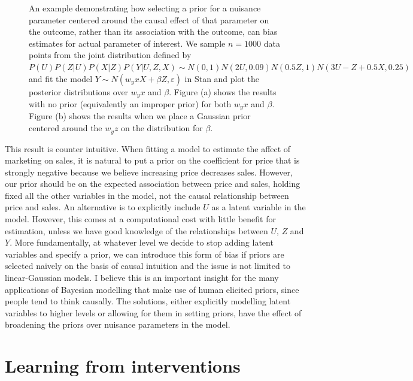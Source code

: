 \documentclass[11pt,a4paper,oneside]{book}
\theoremstyle{plain}
\theoremstyle{definition}
\let\epsilon\varepsilon
\begin{document}
\begin{figure}[h]
\begin{subfigure}[t]{0.99\textwidth}
\end{subfigure}
\caption{An example demonstrating how selecting a prior for a nuisance parameter centered around the causal effect of that parameter on the outcome, rather than its association with the outcome, can bias estimates for actual parameter of interest. We sample $n=1000$ data points from the joint distribution defined by $P(U)P(Z|U)P(X|Z)P(Y|U,Z,X) \sim N(0,1)N(2U,0.09)N(0.5Z,1)N(3U -Z + 0.5X , 0.25)$ and fit the model $Y \sim N(w_yx X+\beta Z,\epsilon)$ in Stan and plot the posterior distributions over $w_yx$ and $\beta$. Figure (a) shows the results with no prior (equivalently an improper prior) for both $w_yx$ and $\beta$. Figure (b) shows the results when we place a Gaussian prior centered around the $w_yz$ on the distribution for $\beta$.}\label{fig:careful-prior-example}
\end{figure}



This result is counter intuitive. When fitting a model to estimate the affect of marketing on sales, it is natural to put a prior on the coefficient for price that is strongly negative because we believe increasing price decreases sales. However, our prior should be on the expected association between price and sales, holding fixed all the other variables in the model, not the causal relationship between price and sales. An alternative is to explicitly include $U$ as a latent variable in the model. However, this comes at a computational cost with little benefit for estimation, unless we have good knowledge of the relationships between $U$, $Z$ and $Y$. More fundamentally, at whatever level we decide to stop adding latent variables and specify a prior, we can introduce this form of bias if priors are selected naively on the basis of causal intuition and the issue is not limited to linear-Gaussian models. I believe this is an important insight for the many applications of Bayesian modelling that make use of human elicited priors, since people tend to think causally. The solutions, either explicitly modelling latent variables to higher levels or allowing for them in setting priors, have the effect of broadening the priors over nuisance parameters in the model. 


\chapter{Learning from interventions}
\label{chap:interventionalist_view}
\end{document}
